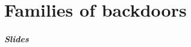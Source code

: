 \part{Families of backdoors}

\begin{frame}
	\partpage
\end{frame}

\begin{frame}
	\frametitle{Slides}
\end{frame}

